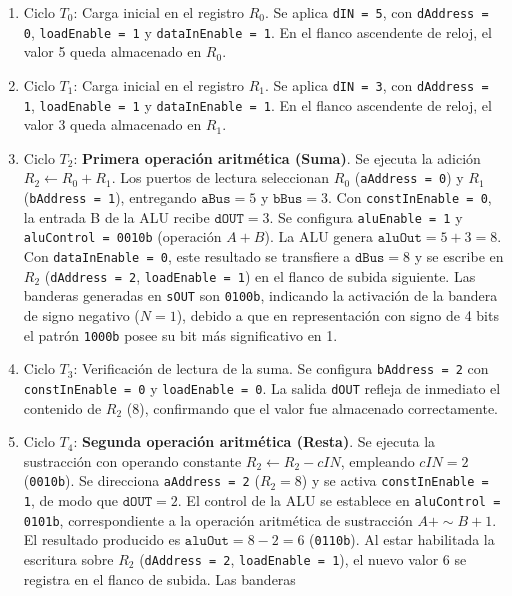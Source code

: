\begin{enumerate}
  \item Ciclo $T_0$: Carga inicial en el registro $R_0$.  Se aplica \texttt{dIN = 5}, con \texttt{dAddress = 0},
    \texttt{loadEnable = 1} y \texttt{dataInEnable = 1}. En el flanco ascendente de reloj, el valor 5 queda almacenado
    en $R_0$.
  \item Ciclo $T_1$: Carga inicial en el registro $R_1$.  Se aplica \texttt{dIN = 3}, con \texttt{dAddress = 1},
    \texttt{loadEnable = 1} y \texttt{dataInEnable = 1}. En el flanco ascendente de reloj, el valor 3 queda almacenado
    en $R_1$.
  \item Ciclo $T_2$: \textbf{Primera operación aritmética (Suma)}.  Se ejecuta la adición $R_2 \leftarrow R_0 + R_1$.
    Los puertos de lectura seleccionan $R_0$ (\texttt{aAddress = 0}) y $R_1$ (\texttt{bAddress = 1}), entregando
    $\texttt{aBus} = 5$ y $\texttt{bBus} = 3$. Con \texttt{constInEnable = 0}, la entrada B de la ALU recibe
    $\texttt{dOUT} = 3$. Se configura \texttt{aluEnable = 1} y \texttt{aluControl = 0010b} (operación $A + B$). La ALU
    genera $\texttt{aluOut} = 5 + 3 = 8$. Con \texttt{dataInEnable = 0}, este resultado se transfiere a $\texttt{dBus} =
    8$ y se escribe en $R_2$ (\texttt{dAddress = 2}, \texttt{loadEnable = 1}) en el flanco de subida siguiente. Las
    banderas generadas en \texttt{sOUT} son \texttt{0100b}, indicando la activación de la bandera de signo negativo ($N
    = 1$), debido a que en representación con signo de 4 bits el patrón \texttt{1000b} posee su bit más significativo en
    1.
  \item Ciclo $T_3$: Verificación de lectura de la suma.  Se configura \texttt{bAddress = 2} con \texttt{constInEnable =
    0} y \texttt{loadEnable = 0}. La salida \texttt{dOUT} refleja de inmediato el contenido de $R_2$ ($8$), confirmando
    que el valor fue almacenado correctamente.
  \item Ciclo $T_4$: \textbf{Segunda operación aritmética (Resta)}.  Se ejecuta la sustracción con operando constante
    $R_2 \leftarrow R_2 - cIN$, empleando $cIN = 2$ (\texttt{0010b}).  Se direcciona \texttt{aAddress = 2} ($R_2 = 8$) y
    se activa \texttt{constInEnable = 1}, de modo que $\texttt{dOUT} = 2$.  El control de la ALU se establece en
    \texttt{aluControl = 0101b}, correspondiente a la operación aritmética de sustracción $A + \sim B + 1$. El resultado
    producido es $\texttt{aluOut} = 8 - 2 = 6$ (\texttt{0110b}). Al estar habilitada la escritura sobre $R_2$
    (\texttt{dAddress = 2}, \texttt{loadEnable = 1}), el nuevo valor 6 se registra en el flanco de subida. Las banderas

\end{enumerate}
